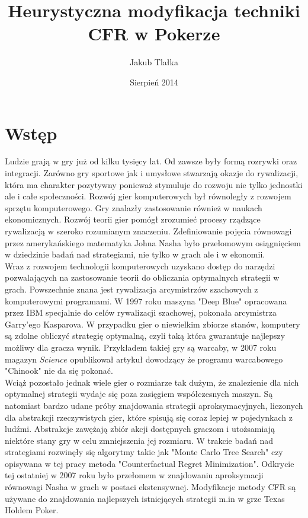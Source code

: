 \documentclass[licencjacka]{pracamgr}
\author{Jakub Tlałka}
\title{Heurystyczna modyfikacja techniki CFR w Pokerze}
\date{Sierpień 2014}
\begin{document}
\maketitle

\begin{abstract}
\end{abstract}

\tableofcontents

\chapter{Wstęp}

\noindent
Ludzie grają w gry już od kilku tysięcy lat. Od zawsze były formą rozrywki oraz integracji.
Zarówno gry sportowe jak i umysłowe stwarzają okazje do rywalizacji, która ma charakter pozytywny ponieważ
stymuluje do rozwoju nie tylko jednostki ale i całe społeczności. Rozwój gier komputerowych był równoległy
z rozwojem sprzętu komputerowego. Gry znalazły zastosowanie również w naukach
ekonomicznych. Rozwój teorii gier pomógł zrozumieć procesy rządzące rywalizacją w szeroko rozumianym
znaczeniu. Zdefiniowanie pojęcia równowagi przez amerykańskiego matematyka Johna Nasha było przełomowym
osiągnięciem w dziedzinie badań nad strategiami, nie tylko w grach ale i w ekonomii. \\

\noindent
Wraz z rozwojem technologii komputerowych uzyskano dostęp do narzędzi pozwalających na zastosowanie
teorii do obliczania optymalnych strategii w grach. Powszechnie znana jest rywalizacja
arcymistrzów szachowych z komputerowymi programami. W 1997 roku maszyna "Deep Blue" opracowana przez IBM
specjalnie do celów rywalizacji szachowej, pokonała arcymistrza Garry'ego Kasparova. W przypadku gier
o niewielkim zbiorze stanów, komputery są zdolne obliczyć strategię optymalną, czyli taką która
gwarantuje najlepszy możliwy dla gracza wynik. Przykładem takiej gry są warcaby, w 2007
roku magazyn $Science$ opublikował artykuł dowodzący że programu warcabowego "Chinook" nie da się pokonać. \\

\noindent
Wciąż pozostało jednak wiele gier o rozmiarze tak dużym, że znalezienie dla nich optymalnej strategii wydaje
się poza zasięgiem współczesnych maszyn. Są natomiast bardzo udane próby znajdowania strategii aproksymacyjnych,
liczonych dla abstrakcji rzeczywistych gier, które spisują się coraz lepiej w pojedynkach z ludźmi.
Abstrakcje zawężają zbiór akcji dostępnych graczom i utożsamiają niektóre stany gry w celu zmniejszenia jej rozmiaru.
W trakcie badań nad strategiami rozwinęły się algorytmy takie jak "Monte Carlo Tree Search" czy opisywana
w tej pracy metoda "Counterfactual Regret Minimization". Odkrycie tej ostatniej w 2007 roku\cite{cfr} było przełomem
w znajdowaniu aproksymacji równowagi Nasha w grach w postaci ekstensywnej. Modyfikacje metody CFR są używane
do znajdowania najlepszych istniejących strategii m.in w grze Texas Holdem Poker. \\
\end{document}

